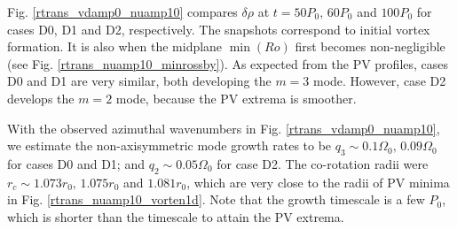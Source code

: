 Fig. \ref{rtrans_vdamp0_nuamp10} compares $\delta\rho$ at
$t=50P_0,\,60P_0$ and $100P_0$ for cases D0, D1 and D2, respectively.
The snapshots correspond to initial vortex formation. It is also when
the midplane $\min(Ro)$ first becomes non-negligible (see
Fig. \ref{rtrans_nuamp10_minrossby}). As expected from the PV
profiles, cases D0 and D1 are very similar, both developing the $m=3$
mode. However, case D2 develops the $m=2$ mode, because the PV extrema
is smoother. 

With the observed azimuthal wavenumbers in
Fig. \ref{rtrans_vdamp0_nuamp10}, we estimate the non-axisymmetric
mode growth rates to be $q_3\sim 0.1\Omega_0,\,0.09\Omega_0$ for cases D0 and D1; and
$q_2\sim0.05\Omega_0$ for case D2. The co-rotation radii were
$r_c\sim1.073r_0,\,1.075r_0$ and $1.081r_0$, which are very close to
the radii of PV minima in Fig. \ref{rtrans_nuamp10_vorten1d}. Note
that the growth timescale is a few $P_0$, which is shorter than the
timescale to attain the PV extrema.  

